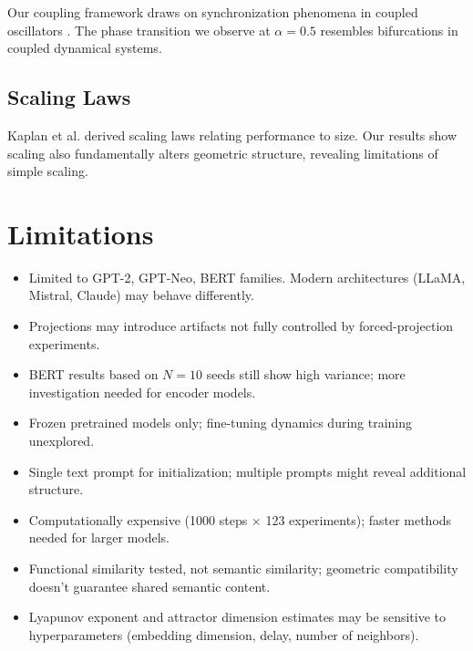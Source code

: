 \documentclass[10pt]{article} %
\theoremstyle{plain}
\theoremstyle{definition}
\theoremstyle{remark}
\begin{document}
Our coupling framework draws on synchronization phenomena in coupled oscillators \cite{kuramoto1984chemical,strogatz2000,pecora1990}. The phase transition we observe at $\alpha = 0.5$ resembles bifurcations in coupled dynamical systems.

\subsection{Scaling Laws}

Kaplan et al. \cite{kaplan2020scaling} derived scaling laws relating performance to size. Our results show scaling also fundamentally alters geometric structure, revealing limitations of simple scaling.

\section{Limitations}

\begin{itemize}
    \item Limited to GPT-2, GPT-Neo, BERT families. Modern architectures (LLaMA, Mistral, Claude) may behave differently.
    \item Projections may introduce artifacts not fully controlled by forced-projection experiments.
    \item BERT results based on $N=10$ seeds still show high variance; more investigation needed for encoder models.
    \item Frozen pretrained models only; fine-tuning dynamics during training unexplored.
    \item Single text prompt for initialization; multiple prompts might reveal additional structure.
    \item Computationally expensive (1000 steps × 123 experiments); faster methods needed for larger models.
    \item Functional similarity tested, not semantic similarity; geometric compatibility doesn't guarantee shared semantic content.
    \item Lyapunov exponent and attractor dimension estimates may be sensitive to hyperparameters (embedding dimension, delay, number of neighbors).
\end{itemize}

\end{document}

